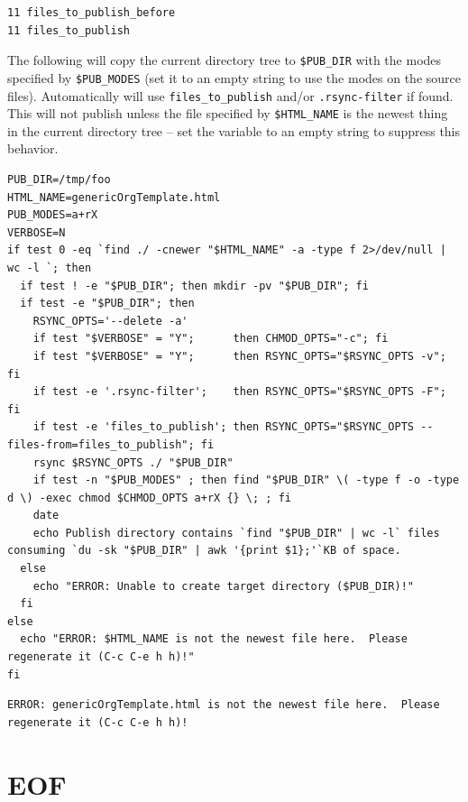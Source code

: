 \documentclass[11pt]{article}
\begin{document}
\begin{verbatim}
11 files_to_publish_before
11 files_to_publish
\end{verbatim}

The following will copy the current directory tree to \texttt{\$PUB\_DIR} with the modes specified by \texttt{\$PUB\_MODES} (set it to an empty string to use the modes on the
source files).  Automatically will use \texttt{files\_to\_publish} and/or \texttt{.rsync-filter} if found.  This will not publish unless the file specified by \texttt{\$HTML\_NAME} is
the newest thing in the current directory tree -- set the variable to an empty string to suppress this behavior.

\begin{verbatim}
PUB_DIR=/tmp/foo
HTML_NAME=genericOrgTemplate.html
PUB_MODES=a+rX
VERBOSE=N
if test 0 -eq `find ./ -cnewer "$HTML_NAME" -a -type f 2>/dev/null | wc -l `; then
  if test ! -e "$PUB_DIR"; then mkdir -pv "$PUB_DIR"; fi
  if test -e "$PUB_DIR"; then
    RSYNC_OPTS='--delete -a'
    if test "$VERBOSE" = "Y";      then CHMOD_OPTS="-c"; fi
    if test "$VERBOSE" = "Y";      then RSYNC_OPTS="$RSYNC_OPTS -v"; fi
    if test -e '.rsync-filter';    then RSYNC_OPTS="$RSYNC_OPTS -F"; fi
    if test -e 'files_to_publish'; then RSYNC_OPTS="$RSYNC_OPTS --files-from=files_to_publish"; fi
    rsync $RSYNC_OPTS ./ "$PUB_DIR"
    if test -n "$PUB_MODES" ; then find "$PUB_DIR" \( -type f -o -type d \) -exec chmod $CHMOD_OPTS a+rX {} \; ; fi      
    date
    echo Publish directory contains `find "$PUB_DIR" | wc -l` files consuming `du -sk "$PUB_DIR" | awk '{print $1};'`KB of space.
  else
    echo "ERROR: Unable to create target directory ($PUB_DIR)!"
  fi
else
  echo "ERROR: $HTML_NAME is not the newest file here.  Please regenerate it (C-c C-e h h)!"
fi
\end{verbatim}

\begin{verbatim}
ERROR: genericOrgTemplate.html is not the newest file here.  Please regenerate it (C-c C-e h h)!
\end{verbatim}


\section{EOF}
\label{sec-11}
\end{document}
